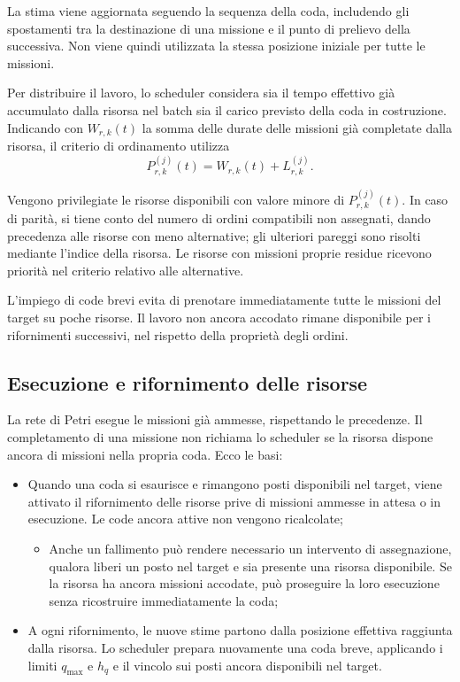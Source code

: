 \noindent La stima viene aggiornata seguendo la sequenza
della coda, includendo gli spostamenti tra la destinazione
di una missione e il punto di prelievo della successiva.
Non viene quindi utilizzata la stessa posizione iniziale
per tutte le missioni.

Per distribuire il lavoro, lo scheduler considera
sia il tempo effettivo già accumulato dalla risorsa
nel batch sia il carico previsto della coda
in costruzione. Indicando con $W_{r,k}(t)$ la somma
delle durate delle missioni già completate dalla risorsa,
il criterio di ordinamento utilizza
\begin{equation}
	P_{r,k}^{(j)}(t)
	=
	W_{r,k}(t)+L_{r,k}^{(j)}.
\end{equation}

\noindent Vengono privilegiate le risorse disponibili con valore
minore di $P_{r,k}^{(j)}(t)$. In caso di parità,
si tiene conto del numero di ordini compatibili
non assegnati, dando precedenza alle risorse
con meno alternative; gli ulteriori pareggi
sono risolti mediante l'indice della risorsa.
Le risorse con missioni proprie residue ricevono
priorità nel criterio relativo alle alternative.

L'impiego di code brevi evita di prenotare
immediatamente tutte le missioni del target
su poche risorse. Il lavoro non ancora accodato
rimane disponibile per i rifornimenti successivi,
nel rispetto della proprietà degli ordini.

\subsection{Esecuzione e rifornimento delle risorse}

La rete di Petri esegue le missioni già ammesse,
rispettando le precedenze. Il completamento di una
missione non richiama lo scheduler se la risorsa
dispone ancora di missioni nella propria coda. Ecco le basi:
\begin{itemize}
	\item Quando una coda si esaurisce e rimangono posti
	disponibili nel target, viene attivato il rifornimento
	delle risorse prive di missioni ammesse in attesa
	o in esecuzione. Le code ancora attive non vengono
	ricalcolate;
	\begin{itemize}
		\item Anche un fallimento può rendere necessario un intervento
		di assegnazione, qualora liberi un posto nel target
		e sia presente una risorsa disponibile.
		Se la risorsa ha ancora missioni accodate,
		può proseguire la loro esecuzione senza ricostruire
		immediatamente la coda;
	\end{itemize}
	\item A ogni rifornimento, le nuove stime partono dalla
	posizione effettiva raggiunta dalla risorsa.
	Lo scheduler prepara nuovamente una coda breve,
	applicando i limiti $q_{\max}$ e $h_q$ e il vincolo
	sui posti ancora disponibili nel target.
\end{itemize}


